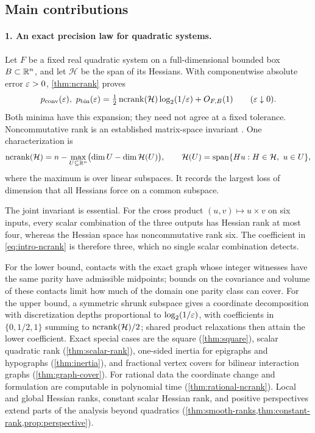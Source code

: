 \subsection{Main contributions}

\paragraph{1. An exact precision law for quadratic systems.}
Let $F$ be a fixed real quadratic system on a full-dimensional bounded
box $B\subset\mathbb R^n$, and let $\mathcal H$ be the span of its Hessians.
With componentwise absolute error $\varepsilon>0$, \cref{thm:ncrank} proves
\begin{equation}\label{eq:intro-ncrank}
 p_{\mathrm{conv}}(\varepsilon),\ p_{\mathrm{bin}}(\varepsilon)
 =\tfrac12\operatorname{ncrank}(\mathcal H)\log_2(1/\varepsilon)+O_{F,B}(1)
 \qquad(\varepsilon\downarrow0).
\end{equation}
Both minima have this expansion; they need not agree at a fixed
tolerance. Noncommutative rank is an established matrix-space invariant
\citep{ggow2020,iqs2018}. One characterization is
\[
 \operatorname{ncrank}(\mathcal H)
 =n-\max_{U\subseteq\mathbb R^n}
       \bigl(\dim U-\dim\mathcal H(U)\bigr),
 \qquad
 \mathcal H(U)=\operatorname{span}\{Hu:H\in\mathcal H,\ u\in U\},
\]
where the maximum is over linear subspaces. It records the largest loss
of dimension that all Hessians force on a common subspace.

The joint invariant is essential. For the cross product
$(u,v)\mapsto u\times v$ on six inputs, every scalar combination of the
three outputs has Hessian rank at most four, whereas the Hessian space
has noncommutative rank six. The coefficient in \eqref{eq:intro-ncrank}
is therefore three, which no single scalar combination detects.

For the lower bound, contacts with the exact graph whose integer
witnesses have the same parity have admissible midpoints; bounds on the
covariance and volume of these contacts limit how much of the domain one
parity class can cover. For the upper bound, a symmetric shrunk subspace
gives a coordinate decomposition with discretization depths proportional
to $\log_2(1/\varepsilon)$, with coefficients in $\{0,1/2,1\}$ summing to
$\operatorname{ncrank}(\mathcal H)/2$; shared product relaxations then attain the
lower coefficient. Exact special cases are the square
(\cref{thm:square}), scalar quadratic rank (\cref{thm:scalar-rank}),
one-sided inertia for epigraphs and hypographs (\cref{thm:inertia}), and
fractional vertex covers for bilinear interaction graphs
(\cref{thm:graph-cover}). For rational data the coordinate change and
formulation are computable in polynomial time
(\cref{thm:rational-ncrank}). Local and global Hessian ranks, constant
scalar Hessian rank, and positive perspectives extend parts of the
analysis beyond quadratics
(\cref{thm:smooth-ranks,thm:constant-rank,prop:perspective}).

